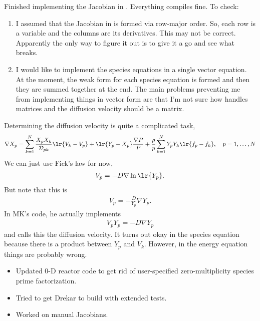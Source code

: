 
Finished implementing the Jacobian in \fenics.  Everything compiles fine.  To check:
\begin{enumerate}
  \item I assumed that the Jacobian in \fenics is formed via row-major order.  So, each row is a variable and the columns are its derivatives.  This may not be correct.  Apparently the only way to figure it out is to give it a go and see what breaks.
  \item I would like to implement the species equations in a single vector equation.  At the moment, the weak form for each species equation is formed and then they are summed together at the end.  The main problems preventing me from implementing things in vector form are that I'm not sure how \fenics handles matrices and the diffusion velocity should be a matrix.
\end{enumerate}

\begin{tcolorbox}[colback=green!5,colframe=green!40!black,title=A note on the diffusion velocity:]
Determining the diffusion velocity is quite a complicated task,
\begin{align*}
  \nabla X_{p} = \sum_{k=1}^{N}{\frac{X_{p}X_{k}}{\mathcal{D}_{pk}}\lr{V_{k} - V_{p}}} + \lr{Y_{p} - X_{p}}\frac{\nabla P}{P} + \frac{\rho}{p}\sum_{k=1}^{N}{Y_{p}Y_{k}\lr{f_{p} - f_{k}}}, \quad  p = 1,\ldots,N
\end{align*}
We can just use Fick's law for now,
\begin{align*}
  V_{p} = -D\nabla\ln\lr{Y_{p}}.
\end{align*}
But note that this is
\begin{align*}
  V_{p} = -\frac{D}{Y_{p}}\nabla Y_{p}.
\end{align*}
In MK's code, he actually implements
\begin{align*}
  V_{p}Y_{p} = -D\nabla Y_{p}
\end{align*}
and calls this the diffusion velocity.  It turns out okay in the species equation because there is a product between $Y_{p}$ and $V_{k}$.  However, in the energy equation things are probably wrong.
\end{tcolorbox}


\begin{itemize}
  \item Updated 0-D reactor code to get rid of user-specified zero-multiplicity species prime factorization.
  \item Tried to get Drekar to build with extended tests.
  \item Worked on manual Jacobians.
\end{itemize}

